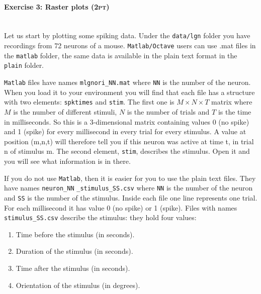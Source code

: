 \documentclass[a4paper,11pt]{article}
\newenvironment{exercise}[3]{\paragraph{Exercise #1: #2 \textsc{(#3pt)}}\ \\}{
\medskip}
\begin{document}
\begin{exercise}{3}{Raster plots}{2}

Let us start by plotting some spiking data. Under the \texttt{data/lgn} folder you have recordings from 72 neurons of a mouse. \texttt{Matlab/Octave} users can use .mat files in the \texttt{matlab} folder, the same data is available in the plain text format in the \texttt{plain} folder.

\texttt{Matlab} files have names \texttt{mlgnori\_NN.mat} where \texttt{NN} is the number of the neuron. When you load it to your environment you will find that each file has a structure with two elements: \texttt{spktimes} and \texttt{stim}. The first one is $M\times N \times T$ matrix where $M$ is the number of different stimuli, $N$ is the number of trials and $T$ is the time in milliseconds. So this is a 3-dimensional matrix containing values 0 (no spike) and 1 (spike) for every millisecond in every trial for every stimulus. A value at position (m,n,t) will therefore tell you if this neuron was active at time t, in trial n of stimulus m. The second element, \texttt{stim}, describes the stimulus. Open it and you will see what information is in there.

If you do not use \texttt{Matlab}, then it is easier for you to use the plain text files. They have names \texttt{neuron\_NN} \texttt{\_stimulus\_SS.csv} where \texttt{NN} is the number of the neuron and \texttt{SS} is the number of the stimulus. Inside each file one line represents one trial. For each millisecond it has value 0 (no spike) or 1 (spike). Files with names \texttt{stimulus\_SS.csv} describe the stimulus: they hold four values:
\begin{enumerate}
\itemsep 0em
	\item Time before the stimulus (in seconds).
	\item Duration of the stimulus (in seconds).
	\item Time after the stimulus (in seconds).
	\item Orientation of the stimulus (in degrees).
\end{enumerate}


\end{exercise}
\end{document}
